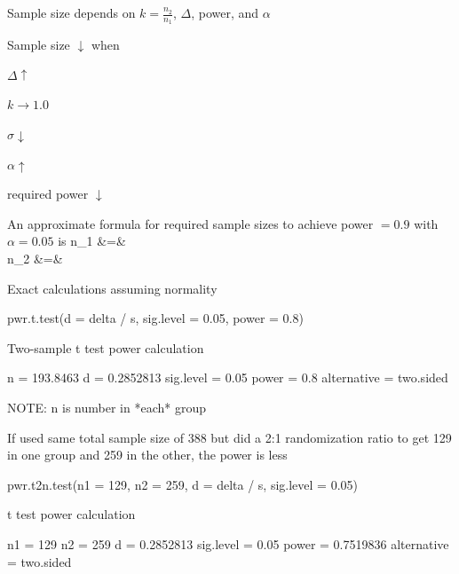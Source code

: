 \item Sample size depends on $k = \frac{n_{2}}{n_{1}}$, $\Delta$, power,
  and $\alpha$
\item Sample size $\downarrow$ when
 \bi
 \item $\Delta \uparrow$
 \item $k \rightarrow 1.0$
 \item $\sigma \downarrow$
 \item $\alpha \uparrow$
 \item required power $\downarrow$
 \ei
\item An approximate formula for required sample sizes to achieve
  power $=0.9$ with $\alpha=0.05$ is
\beqa
n_{1} &=&  \\
n_{2} &=& 
\eeqa
\item Exact calculations assuming normality
\begin{Schunk}
\begin{Sinput}
pwr.t.test(d = delta / s, sig.level = 0.05, power = 0.8)
\end{Sinput}
\begin{Soutput}

     Two-sample t test power calculation 

              n = 193.8463
              d = 0.2852813
      sig.level = 0.05
          power = 0.8
    alternative = two.sided

NOTE: n is number in *each* group
\end{Soutput}
\end{Schunk}
\item If used same total sample size of 388 but did a 2:1
  randomization ratio to get 129 in one group and 259 in the other,
  the power is less
\begin{Schunk}
\begin{Sinput}
pwr.t2n.test(n1 = 129, n2 = 259, d = delta / s, sig.level = 0.05)
\end{Sinput}
\begin{Soutput}

     t test power calculation 

             n1 = 129
             n2 = 259
              d = 0.2852813
      sig.level = 0.05
          power = 0.7519836
    alternative = two.sided
\end{Soutput}
\end{Schunk}
\ei

